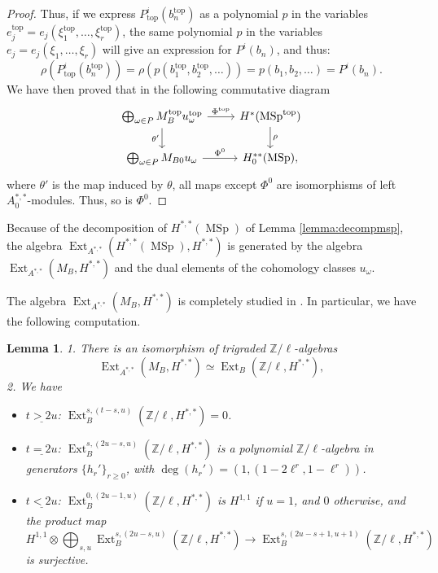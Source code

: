 \documentclass[10pt]{amsart}
\theoremstyle{definition}
\theoremstyle{plain}
\newtheorem{lemma}[defn]{Lemma}
\numberwithin{equation}{section}
\newcommand{\0}{\emptyset}
\newcommand{\MSp}{{\operatorname{MSp}}}
\renewcommand{\deg}{{\operatorname{deg}}}
\renewcommand{\top}{{\operatorname{top}}}
\newcommand{\Ext}{{\operatorname{Ext}}}
\begin{document}
\begin{proof}
    Thus, if we express $P^i_{\top}(b_n^{\top})$ as a polynomial $p$ in the variables $e^\top_j=e_j(\xi_1^{\top}, \ldots, \xi_r^{\top})$, the same polynomial $p$ in the variables $e_j=e_j(\xi_1,\ldots, \xi_r)$ will give an expression for $P^i(b_n)$, and thus:
    $$\rho(P^i_{\top}(b_n^{\top}))=\rho(p(b_1^{\top},b_2^{\top},\ldots))=p(b_1,b_2,\ldots)=P^i(b_n).$$
    We have then proved that in the following commutative diagram
    $$
    \begin{tikzcd}
        \bigoplus_{\omega \in P}M_B^{\top}u_{\omega}^{\top} \arrow[r, "\Phi^{\top}"] \arrow[d, swap, "\theta'"] & H^*(\MSp^{\top}) \arrow[d, "\rho"]\\
        \bigoplus_{\omega \in P}M_{B0}u_{\omega} \arrow[r, "\Phi^0"] & H^{**}_0(\MSp),
    \end{tikzcd}
    $$
    where $\theta'$ is the map induced by $\theta$, all maps except $\Phi^0$ are isomorphisms of left $A^{*,*}_0$-modules. Thus, so is $\Phi^0$.
    \end{proof}

Because of the decomposition of $H^{*,*}(\MSp)$ of Lemma \ref{lemma:decompmsp}, the algebra $\Ext_{A^{*,*}}(H^{*,*}(\MSp),H^{*,*})$ is generated by the algebra $\Ext_{A^{*,*}}(M_B,H^{*,*})$ and the dual elements of the cohomology classes $u_{\omega}$.

    The algebra $\Ext_{A^{*,*}}(M_B,H^{*,*})$ is completely studied in \cite[Section 5.1]{lev:ellcoh}. In particular, we have the following computation.
  
  \begin{lemma}\label{lem:ExtMB}
 1. \cite[Lemma 5.1 and Lemma 5.4]{lev:ellcoh} There is an isomorphism of trigraded $\mathbb{Z}/\ell$-algebras
    $$\Ext_{A^{*,*}}(M_B,H^{*,*}) \simeq \Ext_B(\mathbb{Z}/\ell,H^{*,*}),$$
 2. \cite[Lemma 5.2]{lev:ellcoh} We have  
    \begin{itemize}
        \item $\underline{t>2u}$: $\Ext_B^{s,(t-s,u)}(\mathbb{Z}/\ell,H^{*,*})=0$.
        \item $\underline{t=2u}$: $\Ext_B^{s,(2u-s,u)}(\mathbb{Z}/\ell,H^{*,*})$ is a polynomial $\mathbb{Z}/\ell$-algebra in generators $\{h_r'\}_{r\ge0}$, with $\deg(h_r')=(1,(1-2\ell^r,1-\ell^r))$. 
        \item $\underline{t<2u}$: $\Ext_B^{0,(2u-1,u)}(\mathbb{Z}/\ell,H^{*,*})$ is $H^{1,1}$ if $u=1$, and $0$ otherwise, and the product map
        $$H^{1,1} \otimes \bigoplus_{s,u}\Ext_B^{s,(2u-s,u)}(\mathbb{Z}/\ell,H^{*,*}) \to \Ext_B^{s,(2u-s+1,u+1)}(\mathbb{Z}/\ell,H^{*,*})$$
        is surjective.
    \end{itemize}
    \end{lemma}
\end{document}
